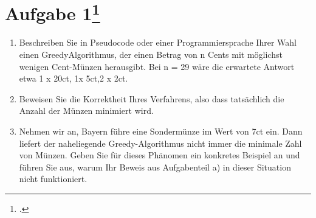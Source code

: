 \documentclass{lehramt-informatik-aufgabe}
\begin{document}
\section{Aufgabe 1\footcite[Thema 1 Aufgabe 1]{examen:66115:2007:03}}

\begin{enumerate}


\item Beschreiben Sie in Pseudocode oder einer Programmiersprache Ihrer
Wahl einen GreedyAlgorithmus, der einen Betrag von n Cents mit möglichst
wenigen Cent-Münzen herausgibt. Bei n = 29 wäre die erwartete Antwort
etwa 1 x 20ct, 1x 5ct,2 x 2ct.


\item Beweisen Sie die Korrektheit Ihres Verfahrens, also dass
tatsächlich die Anzahl der Münzen minimiert wird.


\item Nehmen wir an, Bayern führe eine Sondermünze im Wert von 7ct ein.
Dann liefert der naheliegende Greedy-Algorithmus nicht immer die
minimale Zahl von Münzen. Geben Sie für dieses Phänomen ein konkretes
Beispiel an und führen Sie aus, warum Ihr Beweis aus Aufgabenteil a) in
dieser Situation nicht funktioniert.
\end{enumerate}
\end{document}
